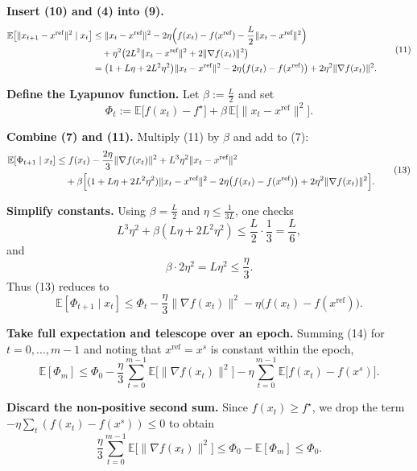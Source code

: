 \documentclass{article}
\newcommand{\E}{\mathbb{E}}
\begin{document}
\begin{enumerate}[label=\textbf{[Step \arabic*]}, leftmargin=*]
\item \textbf{Insert (10) and (4) into (9).}
\[
\begin{aligned}
\E\bigl[\|x_{t+1}-x^{\text{ref}}\|^{2}\mid x_t\bigr]
&\le \|x_t-x^{\text{ref}}\|^{2}
-2\eta\Bigl(f(x_t)-f(x^{\text{ref}})-\frac{L}{2}\|x_t-x^{\text{ref}}\|^{2}\Bigr)\\
&\quad +\eta^{2}\bigl(2L^{2}\|x_t-x^{\text{ref}}\|^{2}+2\|\nabla f(x_t)\|^{2}\bigr)\\
&= \bigl(1+L\eta+2L^{2}\eta^{2}\bigr)\|x_t-x^{\text{ref}}\|^{2}
-2\eta\bigl(f(x_t)-f(x^{\text{ref}})\bigr)
+2\eta^{2}\|\nabla f(x_t)\|^{2}.
\end{aligned}
\tag{11}
\]

\item \textbf{Define the Lyapunov function.}  
Let $\beta:=\frac{L}{2}$ and set
\[
\Phi_t:= \E\bigl[f(x_t)-f^\star\bigr]+\beta\,\E\bigl[\|x_t-x^{\text{ref}}\|^{2}\bigr].
\tag{12}
\]

\item \textbf{Combine (7) and (11).}  
Multiply (11) by $\beta$ and add to (7):
\[
\begin{aligned}
\E[\Phi_{t+1}\mid x_t]
&\le f(x_t)-\frac{2\eta}{3}\|\nabla f(x_t)\|^{2}
+L^{3}\eta^{2}\|x_t-x^{\text{ref}}\|^{2}\\
&\quad +\beta\Bigl[(1+L\eta+2L^{2}\eta^{2})\|x_t-x^{\text{ref}}\|^{2}
-2\eta\bigl(f(x_t)-f(x^{\text{ref}})\bigr)
+2\eta^{2}\|\nabla f(x_t)\|^{2}\Bigr].
\end{aligned}
\tag{13}
\]

\item \textbf{Simplify constants.}  
Using $\beta=\frac{L}{2}$ and $\eta\le\frac{1}{3L}$, one checks
\[
L^{3}\eta^{2}+\beta( L\eta+2L^{2}\eta^{2})\le \frac{L}{2}\cdot\frac{1}{3}= \frac{L}{6},
\]
and
\[
\beta\cdot 2\eta^{2}=L\eta^{2}\le \frac{\eta}{3}.
\]
Thus (13) reduces to
\[
\E[\Phi_{t+1}\mid x_t]\le
\Phi_t-\frac{\eta}{3}\|\nabla f(x_t)\|^{2}
-\eta\bigl(f(x_t)-f(x^{\text{ref}})\bigr).
\tag{14}
\]

\item \textbf{Take full expectation and telescope over an epoch.}  
Summing (14) for $t=0,\dots,m-1$ and noting that $x^{\text{ref}}=x^{s}$ is constant within the epoch,
\[
\E[\Phi_{m}]\le \Phi_{0}
-\frac{\eta}{3}\sum_{t=0}^{m-1}\E\bigl[\|\nabla f(x_t)\|^{2}\bigr]
-\eta\sum_{t=0}^{m-1}\E\bigl[f(x_t)-f(x^{s})\bigr].
\tag{15}
\]

\item \textbf{Discard the non‑positive second sum.}  
Since $f(x_t)\ge f^\star$, we drop the term $-\eta\sum_{t}(f(x_t)-f(x^{s}))\le 0$ to obtain
\[
\frac{\eta}{3}\sum_{t=0}^{m-1}\E\bigl[\|\nabla f(x_t)\|^{2}\bigr]
\le \Phi_{0}-\E[\Phi_{m}]
\le \Phi_{0}.
\tag{16}
\]


\end{enumerate}
\end{document}
